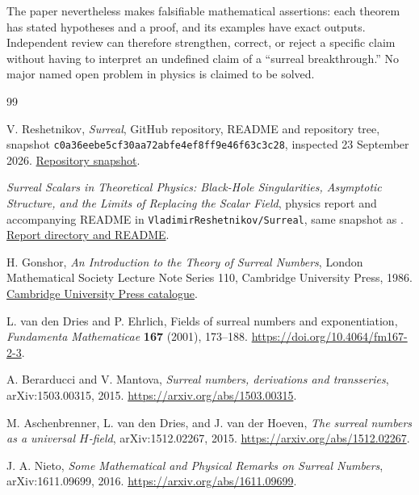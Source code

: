 \documentclass[11pt,oneside]{article}
\numberwithin{equation}{section}
\theoremstyle{plain}
\theoremstyle{definition}
\theoremstyle{remark}
\newcommand{\repo}{\texttt{VladimirReshetnikov/Surreal}}
\begin{document}
The paper nevertheless makes falsifiable mathematical assertions: each theorem has stated hypotheses and a proof, and its examples have exact outputs. Independent review can therefore strengthen, correct, or reject a specific claim without having to interpret an undefined claim of a ``surreal breakthrough.'' No major named open problem in physics is claimed to be solved.

\clearpage
\begin{thebibliography}{99}
\small\raggedright

V. Reshetnikov, \emph{Surreal}, GitHub repository, README and repository tree, snapshot
\texttt{c0a36eebe5cf30aa72abfe4ef8ff9e46f63c3c28}, inspected 23 September 2026.
\href{https://github.com/VladimirReshetnikov/Surreal/tree/c0a36eebe5cf30aa72abfe4ef8ff9e46f63c3c28}{Repository snapshot}.

\emph{Surreal Scalars in Theoretical Physics: Black-Hole Singularities, Asymptotic Structure, and the Limits of Replacing the Scalar Field}, physics report and accompanying README in \repo, same snapshot as \cite{repo}.
\href{https://github.com/VladimirReshetnikov/Surreal/tree/c0a36eebe5cf30aa72abfe4ef8ff9e46f63c3c28/docs/physics/surreal-scalars-and-spacetime}{Report directory and README}.

H. Gonshor, \emph{An Introduction to the Theory of Surreal Numbers}, London Mathematical Society Lecture Note Series 110, Cambridge University Press, 1986.
\href{https://www.cambridge.org/core/books/an-introduction-to-the-theory-of-surreal-numbers/312AE504A3E88E804054BFB390446374}{Cambridge University Press catalogue}.

L. van den Dries and P. Ehrlich, Fields of surreal numbers and exponentiation, \emph{Fundamenta Mathematicae} \textbf{167} (2001), 173--188.
\url{https://doi.org/10.4064/fm167-2-3}.

A. Berarducci and V. Mantova, \emph{Surreal numbers, derivations and transseries}, arXiv:1503.00315, 2015.
\url{https://arxiv.org/abs/1503.00315}.

M. Aschenbrenner, L. van den Dries, and J. van der Hoeven,
\emph{The surreal numbers as a universal $H$-field}, arXiv:1512.02267, 2015.
\url{https://arxiv.org/abs/1512.02267}.

J. A. Nieto, \emph{Some Mathematical and Physical Remarks on Surreal Numbers}, arXiv:1611.09699, 2016.
\url{https://arxiv.org/abs/1611.09699}.


\end{thebibliography}
\end{document}

